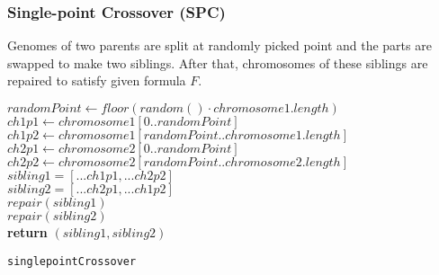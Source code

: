\documentclass{article}
\begin{document}
		\subsubsection{Single-point Crossover (SPC)}
		Genomes of two parents are split at randomly picked point and the parts are swapped to make two siblings. After that, chromosomes of these siblings are repaired to satisfy given formula $F$.
		\begin{center}
			\begin{minipage}{1\linewidth} %
				\begin{algorithm}[H]
					\hrulefill
					\medskip

					$randomPoint \gets floor(random()\cdot chromosome1.length)$\\
					$ch1p1 \gets chromosome1[0..randomPoint]$\\
					$ch1p2 \gets chromosome1[randomPoint..chromosome1.length]$\\

					$ch2p1 \gets chromosome2[0..randomPoint]$\\
					$ch2p2 \gets chromosome2[randomPoint..chromosome2.length]$\\

					$sibling1 = [...ch1p1,...ch2p2]$\\
					$sibling2 = [...ch2p1,...ch1p2]$\\

					$repair(sibling1)$\\
					$repair(sibling2)$\\
					{\bf return} $(sibling1, sibling2)$
					\caption{\texttt{singlepointCrossover}} %
					\label{alg:singlepointCrossover}   %
				\end{algorithm}
			\end{minipage}
		\end{center}
\end{document}
